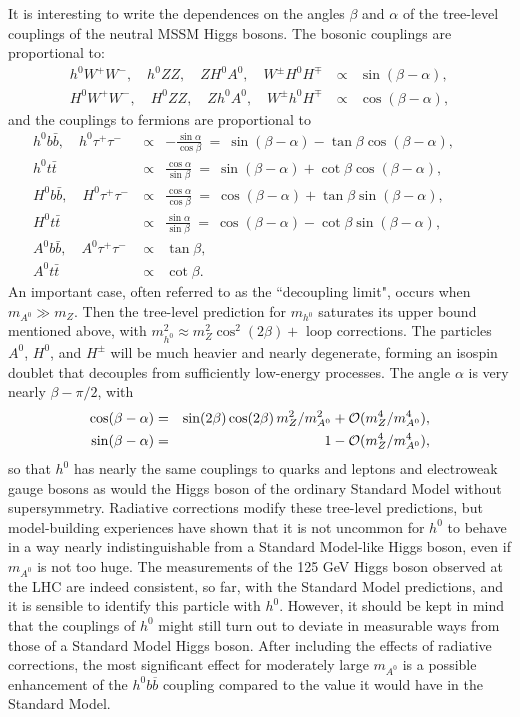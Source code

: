 \documentclass[11pt]{article}
\def\beq{\begin{eqnarray}}
\def\eeq{\end{eqnarray}}
\begin{document}
It is interesting to write the dependences on the angles $\beta$ and $\alpha$ of
the tree-level couplings of the neutral MSSM Higgs bosons. The 
bosonic couplings are proportional to:
\beq
h^0 W^+W^-,\quad h^0 ZZ,\quad Z H^0 A^0,\quad W^\pm H^0 H^\mp &\propto& \sin(\beta-\alpha)
,
\\
H^0 W^+W^-,\quad H^0 ZZ,\quad
Z h^0 A^0,\quad W^\pm h^0 H^\mp\> &\propto& \cos(\beta-\alpha),
\eeq
and the couplings to fermions are proportional to
\beq
h^0b\bar b,\quad h^0\tau^+\tau^-\> &\propto&-\frac{\sin\alpha}{\cos\beta}\>=\>
\sin(\beta-\alpha) - \tan\beta \cos(\beta-\alpha),\phantom{xxxx}
\\
h^0t\bar t\> &\propto& \frac{\cos\alpha}{\sin\beta}\>=\>
\sin(\beta-\alpha) + \cot\beta \cos(\beta-\alpha),
\\
H^0b\bar b,\quad H^0\tau^+\tau^-\> &\propto&\frac{\cos\alpha}{\cos\beta}\>=\>
\cos(\beta-\alpha) + \tan\beta \sin(\beta-\alpha),
\\
H^0t\bar t\> &\propto& \frac{\sin\alpha}{\sin\beta}\>=\>
\cos(\beta-\alpha) - \cot\beta \sin(\beta-\alpha),
\\
A^0b\bar b,\quad A^0\tau^+\tau^-\> &\propto& \tan\beta,
\\
A^0t\bar t\> &\propto& \cot\beta.
\eeq
An important case, often referred to as the ``decoupling limit", occurs 
when $m_{A^0} \gg m_Z$. Then the tree-level prediction for 
$m_{h^0}$ saturates its upper bound 
mentioned above, with $m^2_{h^0} \approx m_Z^2 \cos^2 (2\beta) + $ loop 
corrections. The particles $A^0$, $H^0$, and $H^\pm$ will be much heavier 
and nearly degenerate, forming an isospin doublet that decouples from 
sufficiently low-energy processes. The angle $\alpha$ is very nearly 
$\beta-\pi/2$, with
\beq
\cos(\beta-\alpha) &=& 
\sin(2\beta) \cos(2\beta)\, m_Z^2/m_{A^0}^2+
{\cal O}(m_Z^4/m_{A^0}^4),
\\
\sin(\beta-\alpha) &=& 1 - {\cal O}(m_Z^4/m_{A^0}^4),
\eeq
so that 
$h^0$ has nearly the same couplings to quarks and leptons and 
electroweak gauge bosons as would the Higgs boson of the ordinary 
Standard Model without supersymmetry. Radiative corrections modify these tree-level
predictions, but model-building experiences 
have shown that it is not uncommon for $h^0$ to behave in a way nearly 
indistinguishable from a Standard Model-like Higgs boson, even if 
$m_{A^0}$ is not too huge. The measurements of the 125 GeV Higgs boson observed  
at the LHC are indeed consistent, so far, with the Standard Model predictions,
and it is sensible to identify this particle with $h^0$.
However, it should be kept in mind that the 
couplings of $h^0$ might still turn out to deviate in measurable ways from those 
of a Standard Model Higgs boson. After including the effects of radiative corrections,
the most significant effect for moderately 
large $m_{A^0}$ is a possible enhancement of the $h^0 b \overline b$ 
coupling compared to the value it would have in the Standard Model.
\end{document}
